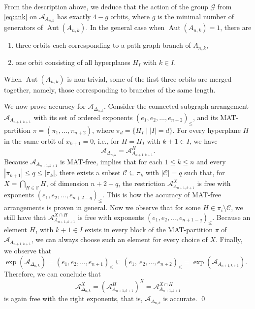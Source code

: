 \documentclass[12pt]{amsart}
\newcommand\CA{{\mathscr A}}
\newcommand\CC{{\mathscr C}}
\newcommand\Aut{{\operatorname{Aut}}}
\numberwithin{equation}{section}
\theoremstyle{plain}
\theoremstyle{definition}
\begin{document}
From the description above, we deduce that the action of the group $\mathcal G$ from \eqref{eq:ank}
on $\CA_{A_{n,k}}$ has exactly $4-g$ orbits, where $g$ is the minimal number of generators of $\Aut(A_{n,k})$. In the general case when $\Aut(A_{n,k}) = 1$, there are
\begin{enumerate}
	\item three orbits each corresponding to a path graph branch of $A_{n,k}$,
	\item one orbit consisting of all hyperplanes $H_I$ with $k\in I$.
\end{enumerate}
When $\Aut(A_{n,k})$ is non-trivial, some of the first three orbits are merged together, namely, those corresponding to branches of the same length.

We now prove accuracy for $\CA_{\Delta_{n,k}}$. Consider the connected subgraph arrangement $\CA_{A_{n+1,k+1}}$ with its set of ordered exponents $(e_1, e_2, \ldots, e_{n+2})_\leq$, and its MAT-partition $\pi = (\pi_1, \ldots,\pi_{n+2})$, where $\pi_d = \{H_I \mid |I| = d\}$. For every hyperplane $H$ in the same orbit of $x_{k+1} = 0$, i.e., for $H=H_I$ with $k+1\in I$, we have $$\CA_{\Delta_{n,k}} = \CA_{A_{n+1,k+1}}^{H}.$$ Because $\CA_{A_{n+1,k+1}}$ is MAT-free,  \cite[Thm.~3.9]{mueckschroehrle:accurate} implies that for each $1\leq k \leq n$ and every $|\pi_{k+1}|\leq q\leq |\pi_k|$, there exists a subset $\CC\subseteq \pi_k$ with $|\CC| = q$ such that, for $X = \bigcap_{H\in\CC} H$, of dimension $n+2-q$, the restriction $\CA_{A_{n+1,k+1}}^X$ is free with exponents $(e_1, e_2, \ldots, e_{n+2-q})_\leq$. This is how the accuracy of MAT-free arrangements is proven in general. Now we observe that for some $H\in\pi_i\setminus\CC$, we still have that $\CA_{A_{n+1,k+1}}^{X\cap H}$ is free with exponents $(e_1, e_2, \ldots, e_{n+1-q})_\leq$. Because an element $H_I$ with $k+1\in I$ exists in every block of the MAT-partition $\pi$ of $\CA_{A_{n+1,k+1}}$, we can always choose such an element for every choice of $X$. Finally, we observe that $\exp(\CA_{\Delta_{n,k}})=(e_1,  e_2, \ldots, e_{n+1})_\leq \subseteq (e_1, \ e_2, \ldots, e_{n+2})_\leq = \exp(\CA_{A_{n+1,k+1}})$. Therefore, we can conclude that
$$
\CA_{\Delta_{n,k}}^X = (\CA_{A_{n+1,k+1}}^H)^X = \CA_{A_{n+1,k+1}}^{X\cap H}
$$
is again free with the right exponents, that is, $\CA_{\Delta_{n,k}}$ is accurate. \qed
\end{document}
